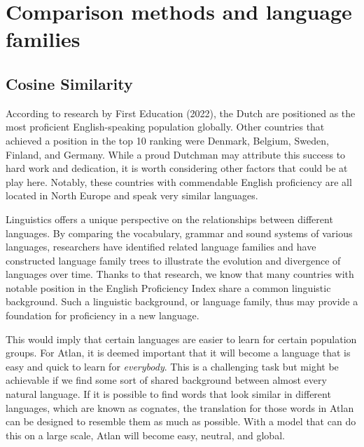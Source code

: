 \section{Comparison methods and language families}

\subsection{Cosine Similarity}

According to research by First Education (2022), the Dutch are positioned as the most proficient English-speaking population globally. Other countries that achieved a position in the top 10 ranking were Denmark, Belgium, Sweden, Finland, and Germany. While a proud Dutchman may attribute this success to hard work and dedication, it is worth considering other factors that could be at play here. Notably, these countries with commendable English proficiency are all located in North Europe and speak very similar languages.  

Linguistics offers a unique perspective on the relationships between different languages. By comparing the vocabulary, grammar and sound systems of various languages, researchers have identified related language families and have constructed language family trees to illustrate the evolution and divergence of languages over time. Thanks to that research, we know that many countries with notable position in the English Proficiency Index share a common linguistic background. Such a linguistic background, or language family, thus may provide a foundation for proficiency in a new language. 

This would imply that certain languages are easier to learn for certain population groups. For Atlan, it is deemed important that it will become a language that is easy and quick to learn for \textit{everybody}. This is a challenging task but might be achievable if we find some sort of shared background between almost every natural language. If it is possible to find words that look similar in different languages, which are known as cognates, the translation for those words in Atlan can be designed to resemble them as much as possible. With a model that can do this on a large scale, Atlan will become easy, neutral, and global.  

